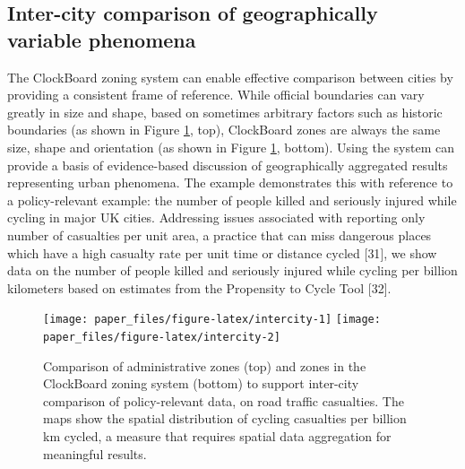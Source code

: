\documentclass{josis}
\begin{document}
\hypertarget{inter-city-comparison-of-geographically-variable-phenomena}{%
\subsection{Inter-city comparison of geographically variable phenomena}\label{inter-city-comparison-of-geographically-variable-phenomena}}

The ClockBoard zoning system can enable effective comparison between cities by providing a consistent frame of reference.
While official boundaries can vary greatly in size and shape, based on sometimes arbitrary factors such as historic boundaries (as shown in Figure \ref{fig:intercity}, top), ClockBoard zones are always the same size, shape and orientation (as shown in Figure \ref{fig:intercity}, bottom).
Using the system can provide a basis of evidence-based discussion of geographically aggregated results representing urban phenomena.
The example demonstrates this with reference to a policy-relevant example: the number of people killed and seriously injured while cycling in major UK cities.
Addressing issues associated with reporting only number of casualties per unit area, a practice that can miss dangerous places which have a high casualty rate per unit time or distance cycled {[}31{]}, we show data on the number of people killed and seriously injured while cycling per billion kilometers based on estimates from the Propensity to Cycle Tool {[}32{]}.

\begin{figure}

{\centering \texttt{[image: paper\_files/figure-latex/intercity-1]} \texttt{[image: paper\_files/figure-latex/intercity-2]} 

}

\caption{Comparison of administrative zones (top) and zones in the ClockBoard zoning system (bottom) to support inter-city comparison of policy-relevant data, on road traffic casualties. The maps show the spatial distribution of cycling casualties per billion km cycled, a measure that requires spatial data aggregation for meaningful results.}\label{fig:intercity}
\end{figure}
\end{document}
